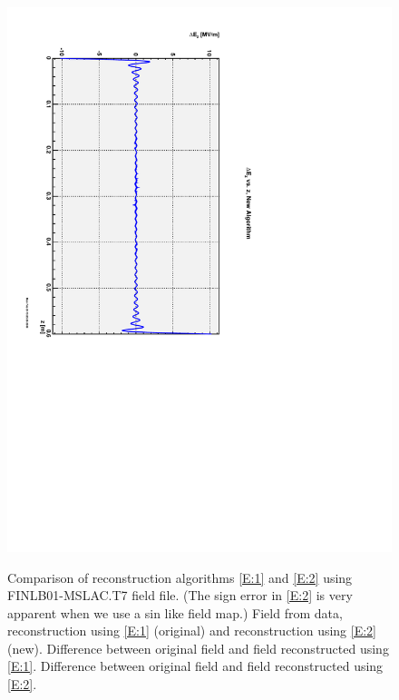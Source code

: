 \documentclass{report}
\begin{document}
\begin{figure}[hbt]
{    \includegraphics[scale=0.4,angle=90.0]{field-diff-new-FINLB01-MSLAC.pdf}}
  \caption{Comparison of reconstruction algorithms \eqref{E:1} and \eqref{E:2} using FINLB01-MSLAC.T7 field file.
    (The sign error in \eqref{E:2} is very apparent when we use a sin like field map.)  Field
    from data, reconstruction using \eqref{E:1} (original) and reconstruction using \eqref{E:2} (new).
     Difference between original field and field reconstructed using \eqref{E:1}.
     Difference between original field and field reconstructed using \eqref{E:2}.}
  \label{Fi:figure-3}
\end{figure}
\end{document}

